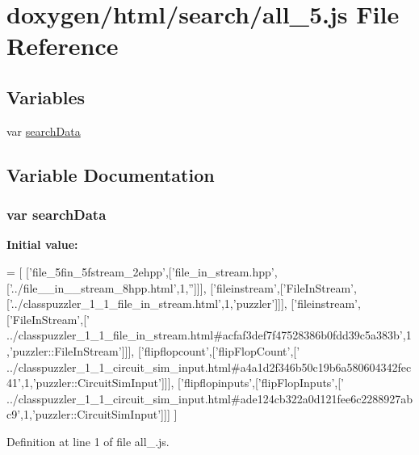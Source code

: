 \hypertarget{a00050}{}\section{doxygen/html/search/all\+\_\+5.js File Reference}
\label{a00050}
\subsection*{Variables}
\begin{DoxyCompactItemize}
\item 
var \hyperlink{a00050_ad01a7523f103d6242ef9b0451861231e}{search\+Data}
\end{DoxyCompactItemize}


\subsection{Variable Documentation}
\hypertarget{a00050_ad01a7523f103d6242ef9b0451861231e}{}
\subsubsection[{search\+Data}]{\setlength{\rightskip}{0pt plus 5cm}var search\+Data}\label{a00050_ad01a7523f103d6242ef9b0451861231e}
{\bfseries Initial value\+:}
\begin{DoxyCode}
=
[
  [\textcolor{stringliteral}{'file\_5fin\_5fstream\_2ehpp'},[\textcolor{stringliteral}{'file\_in\_stream.hpp'},[\textcolor{stringliteral}{'../file\_\_in\_\_stream\_8hpp.html'},1,\textcolor{stringliteral}{''}]]],
  [\textcolor{stringliteral}{'fileinstream'},[\textcolor{stringliteral}{'FileInStream'},[\textcolor{stringliteral}{'../classpuzzler\_1\_1\_file\_in\_stream.html'},1,\textcolor{stringliteral}{'puzzler'}]]],
  [\textcolor{stringliteral}{'fileinstream'},[\textcolor{stringliteral}{'FileInStream'},[\textcolor{stringliteral}{'
      ../classpuzzler\_1\_1\_file\_in\_stream.html#acfaf3def7f47528386b0fdd39c5a383b'},1,\textcolor{stringliteral}{'puzzler::FileInStream'}]]],
  [\textcolor{stringliteral}{'flipflopcount'},[\textcolor{stringliteral}{'flipFlopCount'},[\textcolor{stringliteral}{'
      ../classpuzzler\_1\_1\_circuit\_sim\_input.html#a4a1d2f346b50c19b6a580604342fec41'},1,\textcolor{stringliteral}{'puzzler::CircuitSimInput'}]]],
  [\textcolor{stringliteral}{'flipflopinputs'},[\textcolor{stringliteral}{'flipFlopInputs'},[\textcolor{stringliteral}{'
      ../classpuzzler\_1\_1\_circuit\_sim\_input.html#ade124cb322a0d121fee6c2288927abc9'},1,\textcolor{stringliteral}{'puzzler::CircuitSimInput'}]]]
]
\end{DoxyCode}


Definition at line 1 of file all\+\_.\+js.

